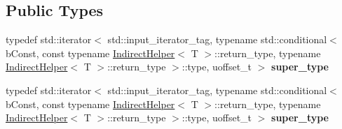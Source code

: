 \subsection*{Public Types}
\begin{DoxyCompactItemize}
\item 
\mbox{\label{structflatbuffers_1_1VectorIterator_a52c5c7012be6f8511ef8789c2d28e458}} 
typedef std\+::iterator$<$ std\+::input\+\_\+iterator\+\_\+tag, typename std\+::conditional$<$ b\+Const, const typename \hyperlink{structflatbuffers_1_1IndirectHelper}{Indirect\+Helper}$<$ T $>$\+::return\+\_\+type, typename \hyperlink{structflatbuffers_1_1IndirectHelper}{Indirect\+Helper}$<$ T $>$\+::return\+\_\+type $>$\+::type, uoffset\+\_\+t $>$ {\bfseries super\+\_\+type}
\item 
\mbox{\label{structflatbuffers_1_1VectorIterator_a52c5c7012be6f8511ef8789c2d28e458}} 
typedef std\+::iterator$<$ std\+::input\+\_\+iterator\+\_\+tag, typename std\+::conditional$<$ b\+Const, const typename \hyperlink{structflatbuffers_1_1IndirectHelper}{Indirect\+Helper}$<$ T $>$\+::return\+\_\+type, typename \hyperlink{structflatbuffers_1_1IndirectHelper}{Indirect\+Helper}$<$ T $>$\+::return\+\_\+type $>$\+::type, uoffset\+\_\+t $>$ {\bfseries super\+\_\+type}
\end{DoxyCompactItemize}
